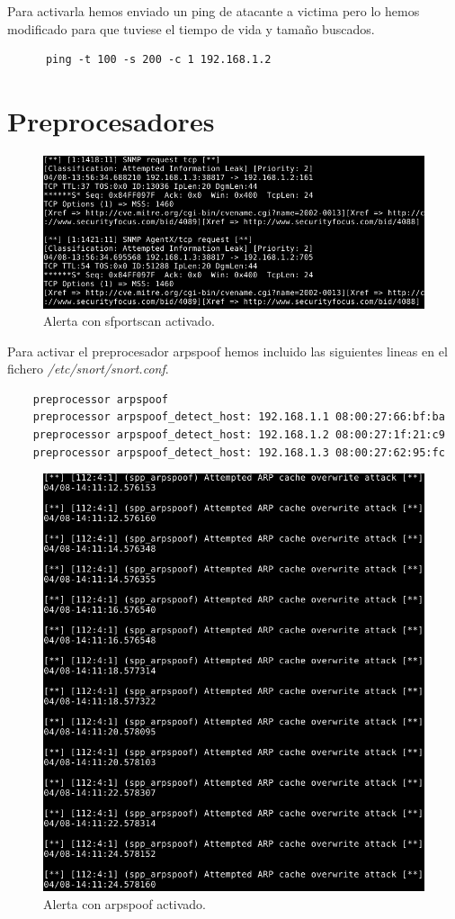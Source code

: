 \documentclass[11pt]{article}
\begin{document}
    Para activarla hemos enviado un ping de atacante a victima pero lo hemos
    modificado para que tuviese el tiempo de vida y tamaño buscados.

    \begin{lstlisting}
      ping -t 100 -s 200 -c 1 192.168.1.2
    \end{lstlisting}

  \section{Preprocesadores}
    \begin{figure}[H]
      \centering
      \includegraphics[width = \textwidth]{sfpa}
      \caption{Alerta con sfportscan activado.}
    \end{figure}

    Para activar el preprocesador arpspoof hemos incluido las siguientes lineas
    en el fichero \textit{/etc/snort/snort.conf}.
    \begin{lstlisting}
    preprocessor arpspoof
    preprocessor arpspoof_detect_host: 192.168.1.1 08:00:27:66:bf:ba
    preprocessor arpspoof_detect_host: 192.168.1.2 08:00:27:1f:21:c9
    preprocessor arpspoof_detect_host: 192.168.1.3 08:00:27:62:95:fc
    \end{lstlisting}

    \begin{figure}[H]
      \centering
      \includegraphics[width = \textwidth]{arpa}
      \caption{Alerta con arpspoof activado.}
    \end{figure}
\end{document}
